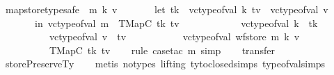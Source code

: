 \begin{isabellebody}
\endisatagproof
{\isafoldproof}%
%
\isadelimproof
\isanewline
%
\endisadelimproof
\isanewline
{}\isamarkupfalse%
\ map{\isacharunderscore}{\kern0pt}store{\isacharunderscore}{\kern0pt}type{\isacharunderscore}{\kern0pt}safe{\isacharcolon}{\kern0pt}\ {\isachardoublequoteopen}{\isasymforall}\ m\ k\ v{\isachardot}{\kern0pt}\isanewline
\ \ \ \ \ \ \ let\ tk\ {\isacharequal}{\kern0pt}\ vc{\isacharunderscore}{\kern0pt}type{\isacharunderscore}{\kern0pt}of{\isacharunderscore}{\kern0pt}val\ k{\isacharsemicolon}{\kern0pt}\ tv\ {\isacharequal}{\kern0pt}\ vc{\isacharunderscore}{\kern0pt}type{\isacharunderscore}{\kern0pt}of{\isacharunderscore}{\kern0pt}val\ v\isanewline
\ \ \ \ \ \ \ in\ {\isacharparenleft}{\kern0pt}vc{\isacharunderscore}{\kern0pt}type{\isacharunderscore}{\kern0pt}of{\isacharunderscore}{\kern0pt}val\ m\ {\isacharequal}{\kern0pt}\ TMapC\ tk\ tv\ {\isasymand}\isanewline
\ \ \ \ \ \ \ \ \ \ \ vc{\isacharunderscore}{\kern0pt}type{\isacharunderscore}{\kern0pt}of{\isacharunderscore}{\kern0pt}val\ k\ {\isacharequal}{\kern0pt}\ tk{\isacharparenright}{\kern0pt}\ {\isasymand}\isanewline
\ \ \ \ \ \ \ \ \ \ vc{\isacharunderscore}{\kern0pt}type{\isacharunderscore}{\kern0pt}of{\isacharunderscore}{\kern0pt}val\ v\ {\isacharequal}{\kern0pt}\ tv\ {\isasymlongrightarrow}\isanewline
\ \ \ \ \ \ \ \ \ \ vc{\isacharunderscore}{\kern0pt}type{\isacharunderscore}{\kern0pt}of{\isacharunderscore}{\kern0pt}val\ {\isacharparenleft}{\kern0pt}wf{\isacharunderscore}{\kern0pt}store\ m\ k\ v{\isacharparenright}{\kern0pt}\ {\isacharequal}{\kern0pt}\isanewline
\ \ \ \ \ \ \ \ \ \ TMapC\ tk\ tv{\isachardoublequoteclose}\isanewline
%
\isadelimproof
\ \ %
\endisadelimproof
%
\isatagproof
{}\isamarkupfalse%
\ {\isacharparenleft}{\kern0pt}rule{\isacharcomma}{\kern0pt}\ case{\isacharunderscore}{\kern0pt}tac\ m{\isacharsemicolon}{\kern0pt}\ simp{\isacharparenright}{\kern0pt}\isanewline
\ \ \isamarkupfalse%
\ transfer\isanewline
\ \ \isamarkupfalse%
\ storePreserveTy\isanewline
\ \ \isamarkupfalse%
\ {\isacharparenleft}{\kern0pt}metis\ {\isacharparenleft}{\kern0pt}no{\isacharunderscore}{\kern0pt}types{\isacharcomma}{\kern0pt}\ lifting{\isacharparenright}{\kern0pt}\ ty{\isacharunderscore}{\kern0pt}to{\isacharunderscore}{\kern0pt}closed{\isachardot}{\kern0pt}simps{\isacharparenleft}{\kern0pt}{}{\isacharparenright}{\kern0pt}\ type{\isacharunderscore}{\kern0pt}of{\isacharunderscore}{\kern0pt}val{\isachardot}{\kern0pt}simps{\isacharparenleft}{\kern0pt}{}{\isacharparenright}{\kern0pt}{\isacharparenright}{\kern0pt}%

\end{isabellebody}
